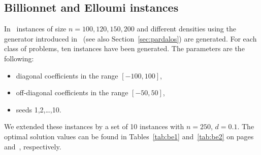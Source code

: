 \documentclass[a4paper, 12pt]{article}
\begin{document}
\subsection{Billionnet and Elloumi instances}
\label{sec:be}
In~\cite{BiEl:07} instances of size $n=100,120,150,200$ and different
densities using the generator introduced in~\cite{PaRo:90} (see also
Section~\ref{sec:pardalos}) are  
generated. For each class of problems, ten instances have been
generated. The parameters are the following: 
\begin{itemize}
\item diagonal coefficients in the range $[-100,100]$,
\item off-diagonal coefficients in the range $[-50,50]$,
\item seeds 1,2,\dots,10.
\end{itemize}
We extended these instances by a set of 10 instances with $n=250$,
$d=0.1$. The optimal solution values can be found in
Tables~\ref{tab:be1} and~\ref{tab:be2} on pages~\pageref{tab:be1}
and~\pageref{tab:be2}, respectively. 
\end{document}

